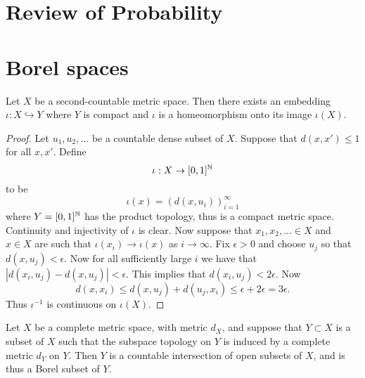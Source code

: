 \documentclass[twoside, a4paper, 10pt]{amsart}
\begin{document}
\appendix

\section{Review of Probability}

\section{Borel spaces}

\begin{lemma} Let $X$ be a second-countable metric space. Then there exists an embedding $\iota:X \hookrightarrow Y$ where $Y$ is compact and $\iota$ is a homeomorphism onto its image $\iota(X)$.

\end{lemma}

\begin{proof} Let $u_1,u_2,\ldots $ be a countable dense subset of $X$. Suppose that $d(x,x')\leq 1$ for all $x,x'$. Define $$\iota:X \to [0,1]^{\mathbb{N}}$$ to be $$\iota(x) = (d(x,u_i))_{i=1}^{\infty}$$ where $Y=[0,1]^{\mathbb{N}}$ has the product topology, thus is a compact metric space. Continuity and injectivity of $\iota$ is clear. Now suppose that $x_1,x_2,\ldots \in X$ and $x\in X$ are such that $\iota(x_i) \to \iota(x)$ as $i \to \infty$. Fix $\epsilon>0$ and choose $u_j$ so that $d(x,u_j)<\epsilon$. Now for all sufficiently large $i$ we have that $|d(x_i, u_j) - d(x,u_j)| < \epsilon$. This implies that $d(x_i,u_j) < 2\epsilon$. Now $$d(x,x_i) \leq d(x,u_j) + d(u_j,x_i) \leq \epsilon + 2\epsilon  = 3\epsilon.$$ Thus $\iota^{-1}$ is continuous on $\iota(X)$. \end{proof}

\begin{lemma} Let $X$ be a complete metric space, with metric $d_X$, and suppose that $Y \subset X$ is a subset of $X$ such that the subspace topology on $Y$ is induced by a complete metric $d_Y$ on $Y$. Then $Y$ is a countable intersection of open subsets of $X$, and is thus a Borel subset of $Y$.

\end{lemma}
\end{document}
